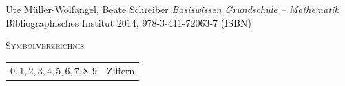 \documentclass[a4paper]{amsart}
\theoremstyle{definition}
\begin{document}
\begin{thebibliography}{9}
      Ute Müller-Wolfangel, Beate Schreiber \emph{Basiswissen Grundschule – Mathematik}
      Bibliographisches Institut 2014, 978-3-411-72063-7 (ISBN)
      
\end{thebibliography}

\begin{large}
    \centerline{\textsc{Symbolverzeichnis}}
\end{large}
\bigskip

\renewcommand*{\arraystretch}{1}

\begin{tabular}{ll}
    $0,1,2,3,4,5,6,7,8,9$          & Ziffern\\
\end{tabular}
\end{document}
